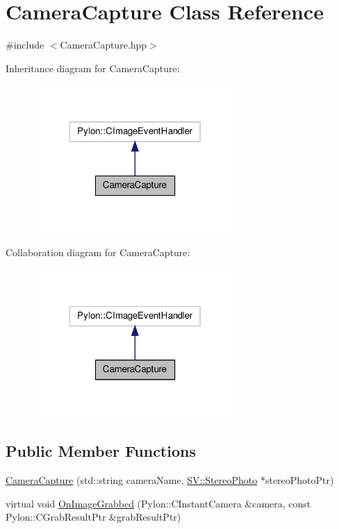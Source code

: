 \hypertarget{class_camera_capture}{\section{Camera\-Capture Class Reference}
\label{class_camera_capture}
}


{\ttfamily \#include $<$Camera\-Capture.\-hpp$>$}



Inheritance diagram for Camera\-Capture\-:
\nopagebreak
\begin{figure}[H]
\begin{center}
\leavevmode
\includegraphics[width=220pt]{class_camera_capture__inherit__graph}
\end{center}
\end{figure}


Collaboration diagram for Camera\-Capture\-:
\nopagebreak
\begin{figure}[H]
\begin{center}
\leavevmode
\includegraphics[width=220pt]{class_camera_capture__coll__graph}
\end{center}
\end{figure}
\subsection*{Public Member Functions}
\begin{DoxyCompactItemize}
\item 
\hyperlink{class_camera_capture_ace260c62593201ab93aa9bb5bb6b3e0e}{Camera\-Capture} (std\-::string camera\-Name, \hyperlink{struct_s_v_1_1_stereo_photo}{S\-V\-::\-Stereo\-Photo} $\ast$stereo\-Photo\-Ptr)
\item 
virtual void \hyperlink{class_camera_capture_a51f4f8a10ee4efbb2a15d5141ed7030c}{On\-Image\-Grabbed} (Pylon\-::\-C\-Instant\-Camera \&camera, const Pylon\-::\-C\-Grab\-Result\-Ptr \&grab\-Result\-Ptr)
\end{DoxyCompactItemize}


